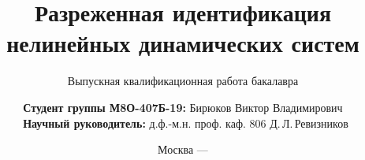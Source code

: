 \title{Разреженная идентификация нелинейных динамических систем}

\subtitle{Выпускная квалификационная работа бакалавра}


\author[Бирюков Виктор Владимирович]
{
  \textbf{Студент группы М8О-407Б-19:} Бирюков Виктор Владимирович\\
  \ \textbf{Научный руководитель:} д.ф.-м.н. проф. каф. 806 Д.\,Л.\,Ревизников
}


\date{Москва --- \the\year}

